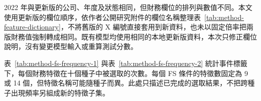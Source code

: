 2022 年與更新版的公司、年度及狀態相同，但財務欄位的排列與數值不同。本文使用更新版的欄位順序，依作者公開研究附件的欄位名稱整理表~\ref{tab:method-feature-dictionary}，不將舊版的 X 編號直接套用到新資料，也未以固定倍率把兩版財務值強制轉成相同。既有模型均使用相同的本地更新版資料，本次只修正欄位說明，沒有變更模型輸入或重算測試分數。



表~\ref{tab:method-fs-frequency-1} 與表~\ref{tab:method-fs-frequency-2} 統計事件標籤下，每個財務特徵在十個種子中被選取的次數。每個 FS 條件的特徵數固定為 9 或 14 個，但特徵名稱可能隨種子而異。此處只描述已完成的選取結果，不把跨種子出現頻率另組成新的特徵子集。



\endgroup
